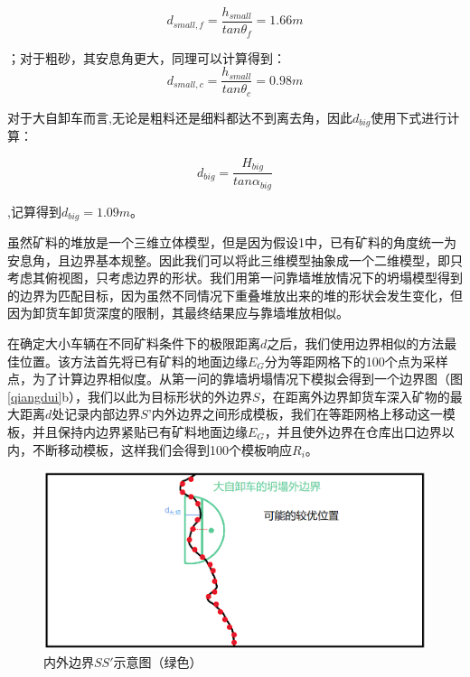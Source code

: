 \documentclass{my_paper}
\begin{document}
\begin{equation*}
    d_{small,f} = \frac{h_{small}}{tan\theta_{f}}=1.66m
\end{equation*}

；对于粗砂，其安息角更大，同理可以计算得到：
\begin{equation*}
    d_{small,c} = \frac{h_{small}}{tan\theta_{c}}=0.98m
\end{equation*}

对于大自卸车而言,无论是粗料还是细料都达不到离去角，因此$d_{big}$使用下式进行计算：

\begin{equation*}
    d_{big} = \frac{H_{big}}{tan\alpha_{big}}
\end{equation*}

,记算得到$d_{big}=1.09m$。

虽然矿料的堆放是一个三维立体模型，但是因为假设1中，已有矿料的角度统一为安息角，且边界基本规整。因此我们可以将此三维模型抽象成一个二维模型，即只考虑其俯视图，只考虑边界的形状。我们用第一问靠墙堆放情况下的坍塌模型得到的边界为匹配目标，因为虽然不同情况下重叠堆放出来的堆的形状会发生变化，但因为卸货车卸货深度的限制，其最终结果应与靠墙堆放相似。

在确定大小车辆在不同矿料条件下的极限距离$d$之后，我们使用边界相似的方法最佳位置。该方法首先将已有矿料的地面边缘$E_G$分为等距网格下的100个点为采样点，为了计算边界相似度。从第一问的靠墙坍塌情况下模拟会得到一个边界图（图\ref{qiangdui}b），我们以此为目标形状的外边界$S$，在距离外边界卸货车深入矿物的最大距离$d$处记录内部边界$S’$内外边界之间形成模板，我们在等距网格上移动这一模板，并且保持内边界紧贴已有矿料地面边缘$E_G$，并且使外边界在仓库出口边界以内，不断移动模板，这样我们会得到100个模板响应$R_i$。

\begin {figure}[h]
\centering %
\includegraphics[width=\textwidth]{neiwai.png}
\caption{内外边界$SS'$示意图（绿色）} %
\label{neiwai}
\end {figure}
\end{document}
